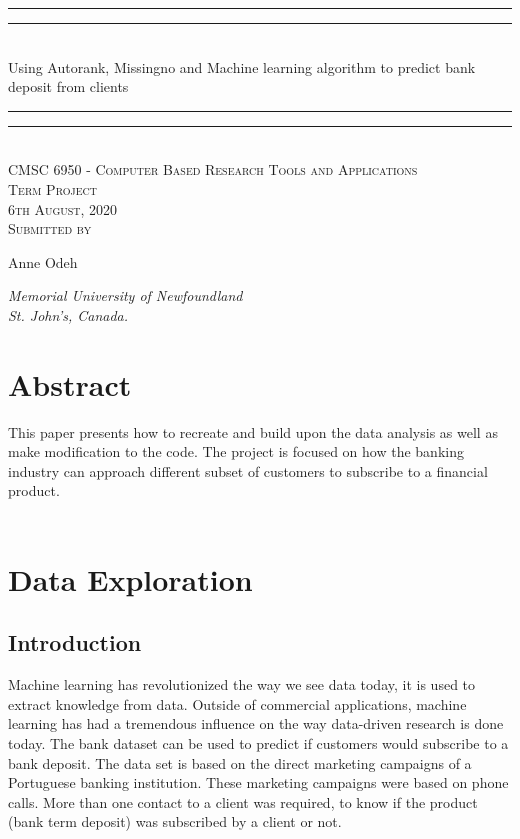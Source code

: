 \documentclass[12pt]{article}
\begin{document}
{\centering

\rule{\textwidth}{1.6pt}\vspace*{-\baselineskip}\vspace*{2pt} 
\rule{\textwidth}{0.4pt}\\[\baselineskip] 
{\LARGE Using Autorank, Missingno and Machine learning algorithm to predict bank deposit from clients }
\rule{\textwidth}{0.4pt}\vspace*{-\baselineskip}\vspace{3.2pt}
\rule{\textwidth}{1.6pt}\\[\baselineskip] 

\vspace{20mm} %
\scshape %
CMSC 6950 - Computer Based Research Tools and Applications \\ [\baselineskip]
Term Project \\[\baselineskip] 
6th August, 2020 \\[\baselineskip] 
\vspace{20mm} %
Submitted by \\[\baselineskip]
{\Large Anne Odeh \par}
\vfill
{\itshape Memorial University of Newfoundland \\ St. John's, Canada.\par} 
}

\newpage

{\centering
  \section*{Abstract}
}
This paper presents how to recreate and build upon the data analysis as well as make modification to the code. The project is focused on how the banking industry can approach different subset of customers to subscribe to a financial product. \\\\

\section{Data Exploration}
\subsection{Introduction}
Machine learning has revolutionized the way we see data today, it is used to extract
knowledge from data. Outside of commercial applications, machine learning has had a
tremendous influence on the way data-driven research is done today. The bank dataset can be used to predict if customers would subscribe to a bank deposit. The data set is based on the direct marketing campaigns of a Portuguese banking institution. These marketing campaigns were based on phone calls. More than one contact to a client was required, to know if the product (bank term deposit) was subscribed by a client or not.
\end{document}

